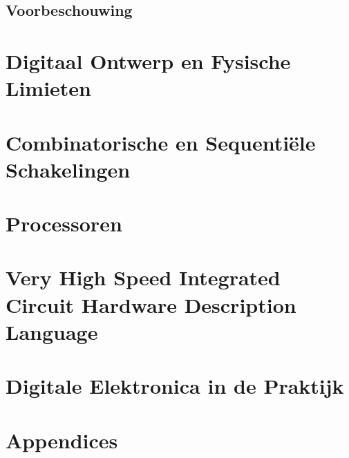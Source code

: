 \documentclass[a4paper,10pt,titlepage]{book}
\begin{document}
\chapter*{Voorbeschouwing}

\mainmatter
\part{Digitaal Ontwerp en Fysische Limieten}



\part{Combinatorische en Sequenti\"ele Schakelingen}



\part{Processoren}



\part{Very High Speed Integrated Circuit Hardware Description Language}


\part{Digitale Elektronica in de Praktijk}



\appendix
\part{Appendices}




\backmatter
\listoftables
\listoffigures
{}
\begin{twocolumn}
\nocite{*}


\label{biblio}
\end{twocolumn}
\label{glos}
\printglossary[title=Woordenlijst,toctitle=Woordenlijst]
\label{idx}
\printindex
\end{document}
